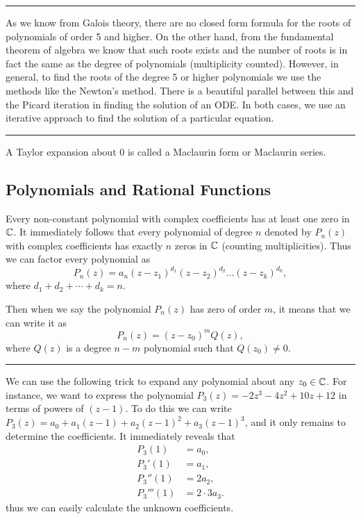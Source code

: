 \hrule
\begin{fact}
	As we know from Galois theory, there are no closed form formula for the roots of polynomials of order 5 and higher. On the other hand, from the fundamental theorem of algebra we know that such roots exists and the number of roots is in fact the same as the degree of polynomials (multiplicity counted). However, in general, to find the roots of the degree 5 or higher polynomials we use the methods like the Newton's method. There is a beautiful parallel between this and the Picard iteration in finding the solution of an ODE. In both cases, we use an iterative approach to find the solution of a particular equation.
\end{fact}

\hrule

\begin{fact}
	A Taylor expansion about 0 is called a Maclaurin form or Maclaurin series.
\end{fact}



\subsection{Polynomials and Rational Functions}

\begin{fact}
	Every non-constant polynomial with complex coefficients has at least one zero in $\mathbb{C}$. It immediately follows that every polynomial of degree $n$ denoted by $P_n(z)$ with complex coefficients has exactly $n$ zeros in $\mathbb{C}$ (counting multiplicities). Thus we can factor every polynomial as
	\[ P_n(z) = a_n (z-z_1)^{d_1}(z-z_2)^{d_2} \hdots (z-z_k)^{d_k}, \]
	where $d_1 + d_2 + \cdots + d_k = n$.
	
	Then when we say the polynomial $P_n(z)$ has zero of order $m$, it means that we can write it as
	\[ P_n(z) = (z-z_0)^m Q(z), \]
	where $Q(z)$ is a degree $n-m$ polynomial such that $Q(z_0) \neq 0$.
\end{fact}


\hrule


\begin{fact}
	We can use the following trick to expand any polynomial about any $z_0 \in \mathbb{C}$. For instance, we want to express the polynomial $P_3(z) = -2z^3 -4z^2 + 10z + 12$ in terms of powers of $(z-1)$. To do this we can write $P_3(z) = a_0 + a_1(z-1)+a_2(z-1)^2 + a_3(z-1)^3$, and it only remains to determine the coefficients. It immediately reveals that 
	\begin{align*}
		P_3(1) &= a_0, \\
		P_3'(1) &= a_1, \\
		P_3''(1) &= 2 a_2, \\
		P_3'''(1) &= 2\cdot 3 a_3.
	\end{align*}
	thus we can easily calculate the unknown coefficients. 
\end{fact}


